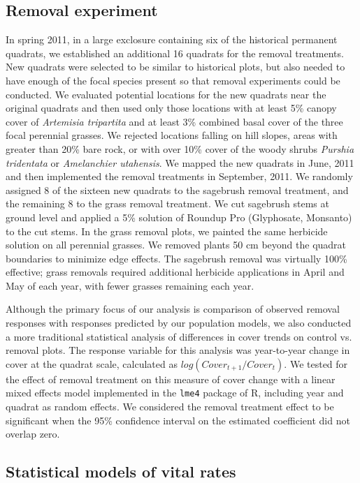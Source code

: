 \documentclass[11pt]{article}
\begin{document}
\begin{doublespacing}
\subsection*{Removal experiment}
In spring 2011, in a large exclosure containing six of the historical permanent quadrats, we established an additional 16 quadrats for the removal treatments. New quadrats were selected to be similar to historical plots, but also needed to have enough of the focal species present so that removal experiments could be conducted. We evaluated potential locations for the new quadrats near the original quadrats and then used only those locations with at least 5\% canopy cover of \textit{Artemisia tripartita} and at least 3\% combined basal cover of the three focal perennial grasses. We rejected locations falling on hill slopes, areas with greater than 20\% bare rock, or with over 10\% cover of the woody shrubs \textit{Purshia tridentata} or \textit{Amelanchier utahensis}. We mapped the new quadrats in June, 2011 and then implemented the removal treatments in September, 2011. We randomly assigned 8 of the sixteen new quadrats to the sagebrush removal treatment, and the remaining 8 to the grass removal treatment. We cut sagebrush stems at ground level and applied a 5\% solution of Roundup Pro (Glyphosate, Monsanto) to the cut stems. In the grass removal plots, we painted the same herbicide solution on all perennial grasses. We removed plants 50 cm beyond the quadrat boundaries to minimize edge effects. The sagebrush removal was virtually 100\% effective; grass removals required additional herbicide applications in April and May of each year, with fewer grasses remaining each year.

Although the primary focus of our analysis is comparison of observed removal responses with responses predicted by our population models, we also conducted a more traditional statistical analysis of differences in cover trends on control vs. removal plots. The response variable for this analysis was year-to-year change in cover at the quadrat scale, calculated as $log(Cover_{t+1}/Cover_t)$. We tested for the effect of removal treatment on this measure of cover change with a linear mixed effects model implemented in the \texttt{lme4} package \citep{Bates2015} of R, including year and quadrat as random effects. We considered the removal treatment effect to be significant when the 95\% confidence interval on the estimated coefficient did not overlap zero.

\subsection*{Statistical models of vital rates}


\end{doublespacing}
\end{document}
